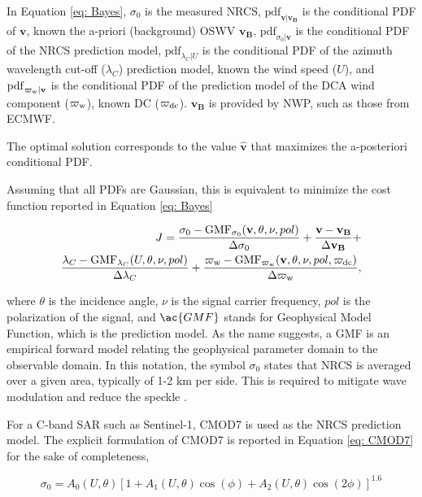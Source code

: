 In Equation \ref{eq: Bayes}, $\sigma_{0}$ is the measured \ac{NRCS},
$\mathrm{pdf}_{\mathbf{v}|\mathbf{v_{B}}}$ is the conditional \ac{PDF} of
$\mathbf{v}$, known the a-priori (background) \ac{OSWV} $\mathbf{v_{B}}$,
$\mathrm{pdf}_{\sigma_{0}|\mathbf{v}}$ is the conditional \ac{PDF} of the
\ac{NRCS} prediction model, $\mathrm{pdf}_{\lambda_{C}|U}$ is the conditional
\ac{PDF} of the azimuth wavelength cut-off ($\lambda_{C}$) prediction model,
known the wind speed ($U$), and $\mathrm{pdf}_{\varpi_{\rm w}|\mathbf{v}}$ is
the conditional \ac{PDF} of the prediction model of the \ac{DCA} wind component
($\varpi_{\rm w}$), known \ac{DC} ($\varpi_{\rm dc}$). $\mathbf{v_{B}}$ is
provided by  \ac{NWP}, such as those from \ac{ECMWF}.

The optimal solution corresponds to the value $\mathbf{\hat{v}}$ that maximizes
the a-posteriori conditional \ac{PDF}.

Assuming that all \acp{PDF} are Gaussian, this is equivalent to minimize the
cost function reported in Equation \ref{eq: Bayes}

\begin{eqnarray}
	J = \frac{\sigma_{0}-\mathrm{GMF}_{\sigma_{0}}(\mathbf{v},\theta,\nu,pol)}{\Delta \sigma_{0}}+\frac{\mathbf{v}-\mathbf{v_{B}}}{\Delta \mathbf{v_{B}}}+ \nonumber \\
	\frac{\lambda_{C}-\mathrm{GMF}_{\lambda_{C}}(U,\theta,\nu,pol)}{\Delta \lambda_{C}}+\frac{\varpi_{\rm w}-\mathrm{GMF}_{\varpi_{\rm w}}(\mathbf{v},\theta,\nu,pol,\varpi_{\rm dc})}{\Delta \varpi_{\rm w}},
	\label{eq: Bayes}
\end{eqnarray}

\noindent where $\theta$ is the incidence angle, $\nu$ is the signal carrier
frequency, $pol$ is the polarization of the signal, and $\ac{GMF}$ stands
for Geophysical Model Function, which is the prediction model. As the name
suggests, a \ac{GMF} is an empirical forward model relating the geophysical
parameter domain to the observable domain. In this notation, the symbol
$\sigma_{0}$ states that \ac{NRCS} is averaged over a given area, typically of
1-2 km per side. This is required to mitigate wave modulation and reduce the
speckle \cite{MigliaccioJOE2007}. 

For a C-band \ac{SAR} such as Sentinel-1, CMOD7 \cite{StoffelenJSTARS2017} is used
as the \ac{NRCS} prediction model. The explicit formulation of CMOD7 is reported in
Equation \ref{eq: CMOD7} for the sake of completeness,

\begin{equation}
	\sigma_{0} = A_{0}(U,\theta) \left[1 + A_{1}(U, \theta) \cos(\phi)+A_{2}(U, \theta) \cos(2\phi) \right]^{1.6}
\label{eq: CMOD7}
\end{equation}

